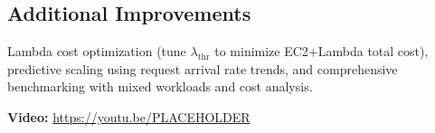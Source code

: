 \documentclass[10pt,twocolumn]{article}
\begin{document}
\subsection{Additional Improvements}

Lambda cost optimization (tune $\lambda_{\text{thr}}$ to minimize EC2+Lambda total cost), predictive scaling using request arrival rate trends, and comprehensive benchmarking with mixed workloads and cost analysis.

\vspace{3pt}
\noindent\textbf{Video:} \url{https://youtu.be/PLACEHOLDER}
\end{document}
